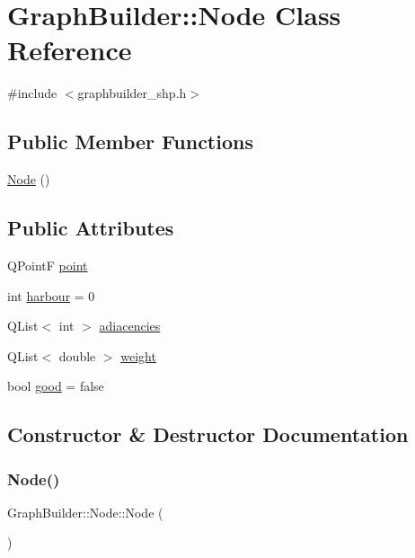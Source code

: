\hypertarget{class_graph_builder_1_1_node}{}\section{Graph\+Builder\+::Node Class Reference}
\label{class_graph_builder_1_1_node}


{\ttfamily \#include $<$graphbuilder\+\_\+shp.\+h$>$}

\subsection*{Public Member Functions}
\begin{DoxyCompactItemize}
\item 
\mbox{\hyperlink{class_graph_builder_1_1_node_a019f1359863a29af2d88273760feabb2}{Node}} ()
\end{DoxyCompactItemize}
\subsection*{Public Attributes}
\begin{DoxyCompactItemize}
\item 
Q\+PointF \mbox{\hyperlink{class_graph_builder_1_1_node_a01fd983b9d56b04b0350542501a1755a}{point}}
\item 
int \mbox{\hyperlink{class_graph_builder_1_1_node_ab6abadaf370d954a2f3b736e90e44832}{harbour}} = 0
\item 
Q\+List$<$ int $>$ \mbox{\hyperlink{class_graph_builder_1_1_node_a8e46bdb858c3e02057790215ca2a8b48}{adiacencies}}
\item 
Q\+List$<$ double $>$ \mbox{\hyperlink{class_graph_builder_1_1_node_a22ac7a5471919fbf17aad85949ce0cae}{weight}}
\item 
bool \mbox{\hyperlink{class_graph_builder_1_1_node_a440e673cadd3ae077d6e5dc585bf4977}{good}} = false
\end{DoxyCompactItemize}


\subsection{Constructor \& Destructor Documentation}
\mbox{\label{class_graph_builder_1_1_node_a019f1359863a29af2d88273760feabb2}} 
\subsubsection{\texorpdfstring{Node()}{Node()}}
{\footnotesize\ttfamily Graph\+Builder\+::\+Node\+::\+Node (\begin{DoxyParamCaption}{ }\end{DoxyParamCaption})\hspace{0.3cm}{\ttfamily [inline]}}



